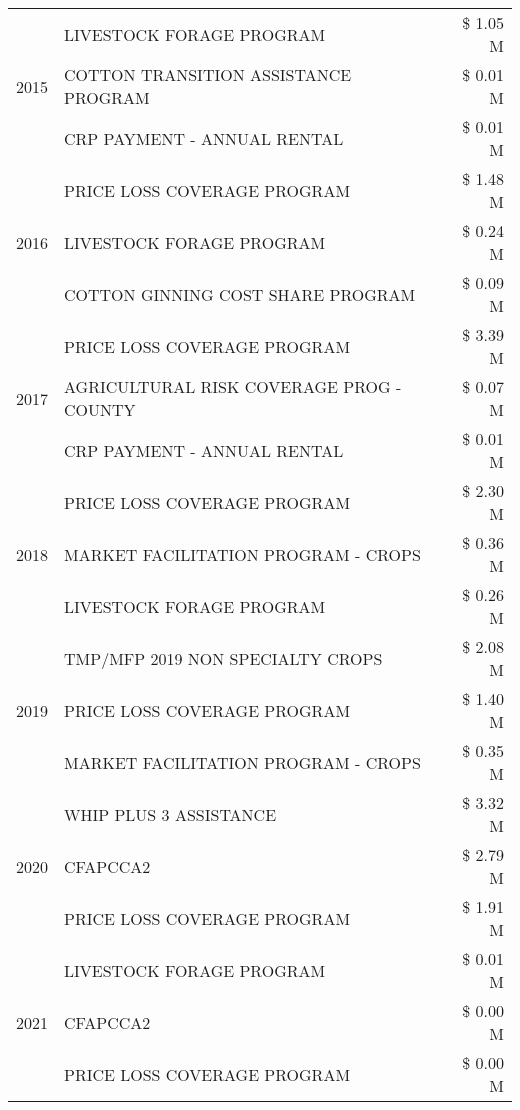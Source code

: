 \begin{tabular}{llr}
\cline{1-3}
\multirow[t]{3}{*}{2015} & LIVESTOCK FORAGE PROGRAM & \$ 1.05 M \\
 & COTTON TRANSITION ASSISTANCE PROGRAM & \$ 0.01 M \\
 & CRP PAYMENT - ANNUAL RENTAL & \$ 0.01 M \\
\cline{1-3}
\multirow[t]{3}{*}{2016} & PRICE LOSS COVERAGE PROGRAM & \$ 1.48 M \\
 & LIVESTOCK FORAGE PROGRAM & \$ 0.24 M \\
 & COTTON GINNING COST SHARE PROGRAM & \$ 0.09 M \\
\cline{1-3}
\multirow[t]{3}{*}{2017} & PRICE LOSS COVERAGE PROGRAM & \$ 3.39 M \\
 & AGRICULTURAL RISK COVERAGE PROG - COUNTY & \$ 0.07 M \\
 & CRP PAYMENT - ANNUAL RENTAL & \$ 0.01 M \\
\cline{1-3}
\multirow[t]{3}{*}{2018} & PRICE LOSS COVERAGE PROGRAM & \$ 2.30 M \\
 & MARKET FACILITATION PROGRAM - CROPS & \$ 0.36 M \\
 & LIVESTOCK FORAGE PROGRAM & \$ 0.26 M \\
\cline{1-3}
\multirow[t]{3}{*}{2019} & TMP/MFP 2019 NON SPECIALTY CROPS & \$ 2.08 M \\
 & PRICE LOSS COVERAGE PROGRAM & \$ 1.40 M \\
 & MARKET FACILITATION PROGRAM - CROPS & \$ 0.35 M \\
\cline{1-3}
\multirow[t]{3}{*}{2020} & WHIP PLUS 3 ASSISTANCE & \$ 3.32 M \\
 & CFAPCCA2 & \$ 2.79 M \\
 & PRICE LOSS COVERAGE PROGRAM & \$ 1.91 M \\
\cline{1-3}
\multirow[t]{3}{*}{2021} & LIVESTOCK FORAGE PROGRAM & \$ 0.01 M \\
 & CFAPCCA2 & \$ 0.00 M \\
 & PRICE LOSS COVERAGE PROGRAM & \$ 0.00 M \\
\cline{1-3}
\bottomrule
\end{tabular}

